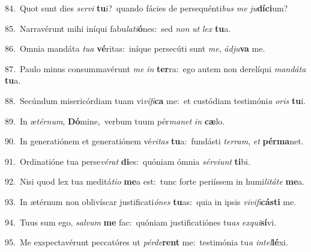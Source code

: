 {\numbfont\textcolor{\numbcolor}{84.}}~Quot sunt dies \textit{ser}\-\textit{vi} \textbf{tu}\-i?~\star quando fácies de persequénti\textit{bus} \textit{me} \textit{ju}\-\textbf{dí}\textbf{ci}um?\par
{\numbfont\textcolor{\numbcolor}{85.}}~Narravérunt mihi iníqui fabu\-\textit{la}\-\textit{ti}\textbf{ó}nes:~\star sed \textit{non} \textit{ut} \textit{lex} \textbf{tu}\-a.\par
{\numbfont\textcolor{\numbcolor}{86.}}~Omnia mandáta \textit{tu}\-\textit{a} \textbf{vé}\-ritas:~\star iníque persecúti sunt \textit{me}\-, \textit{ád}\-\textit{ju}\textbf{va} me.\par
{\numbfont\textcolor{\numbcolor}{87.}}~Paulo minus consummavérunt \textit{me} \textit{in} \textbf{ter}\-ra:~\star ego autem non derelíqui \textit{man}\-\textit{dá}\textit{ta} \textbf{tu}\-a.\par
{\numbfont\textcolor{\numbcolor}{88.}}~Secúndum misericórdiam tuam vi\-\textit{ví}\-\textit{fi}\textbf{ca} me:~\star et custódiam testimóni\textit{a} \textit{o}\-\textit{ris} \textbf{tu}\-i.\par
{\numbfont\textcolor{\numbcolor}{89.}}~In æ\-\textit{tér}\-\textit{num}, \textbf{Dó}\-mine,~\star verbum tuum pér\-\textit{ma}\-\textit{net} \textit{in} \textbf{cæ}\-lo.\par
{\numbfont\textcolor{\numbcolor}{90.}}~In generatiónem et generatiónem vé\-\textit{ri}\-\textit{tas} \textbf{tu}\-a:~\star fundásti \textit{ter}\-\textit{ram}, \textit{et} \textbf{pér}\-\textbf{ma}net.\par
{\numbfont\textcolor{\numbcolor}{91.}}~Ordinatióne tua perse\-\textit{vé}\-\textit{rat} \textbf{di}\-es:~\star quóniam ómnia \textit{sér}\-\textit{vi}\textit{unt} \textbf{ti}\-bi.\par
{\numbfont\textcolor{\numbcolor}{92.}}~Nisi quod lex tua meditá\-\textit{ti}\-\textit{o} \textbf{me}\-a est:~\star tunc forte periíssem in humi\-\textit{li}\-\textit{tá}\textit{te} \textbf{me}\-a.\par
{\numbfont\textcolor{\numbcolor}{93.}}~In ætérnum non oblivíscar justificati\-\textit{ó}\-\textit{nes} \textbf{tu}\-as:~\star quia in ipsis \textit{vi}\-\textit{vi}\textit{fi}\textbf{cás}\textbf{ti} me.\par
{\numbfont\textcolor{\numbcolor}{94.}}~Tuus sum ego, \textit{sal}\-\textit{vum} \textbf{me} fac:~\star quóniam justificatiónes tu\textit{as} \textit{ex}\-\textit{qui}\textbf{sí}vi.\par
{\numbfont\textcolor{\numbcolor}{95.}}~Me exspectavérunt peccatóres ut \textit{pér}\-\textit{de}\textbf{rent} me:~\star testimónia tu\textit{a} \textit{in}\-\textit{tel}\textbf{lé}xi.\par

